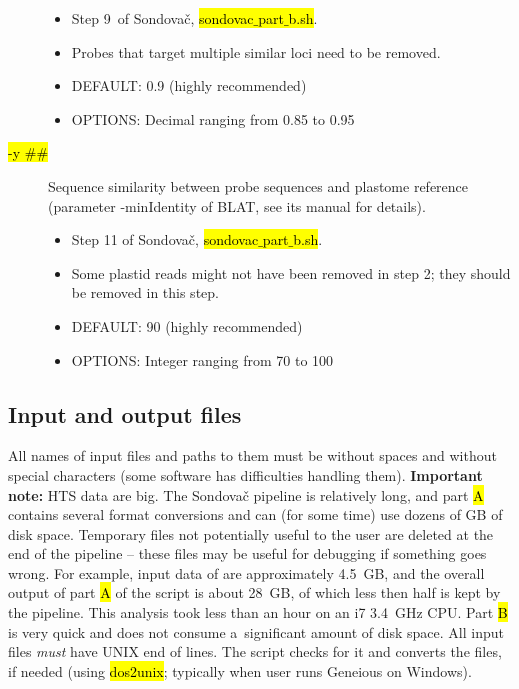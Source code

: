 \documentclass[a4paper, 11pt, twoside]{article}
\renewcommand{\texttt}[1]{\hl{\ttfamily #1}}
\begin{document}
\begin{description}
  \begin{itemize}
    \item Step 9~of Sondovač, \texttt{sondovac$\_$part$\_$b.sh}.
    \item Probes that target multiple similar loci need to be removed.
    \item DEFAULT: 0.9 (highly recommended)
    \item OPTIONS: Decimal ranging from 0.85 to 0.95
  \end{itemize}
\item[\texttt{-y \#\#}] Sequence similarity between probe sequences and plastome reference (parameter -minIde\-ntity of BLAT, see its manual for details).
  \begin{itemize}
    \item Step 11 of Sondovač, \texttt{sondovac$\_$part$\_$b.sh}.
    \item Some plastid reads might not have been removed in step 2; they should be removed in this step.
    \item DEFAULT: 90 (highly recommended)
    \item OPTIONS: Integer ranging from 70 to 100
  \end{itemize}
\end{description}

\subsection{Input and output files}

All names of input files and paths to them must be without spaces and without special characters (some software has difficulties handling them). \textbf{Important note:} HTS data are big. The Sondovač pipeline is relatively long, and part \texttt{A} contains several format conversions and can (for some time) use dozens of GB of disk space. Temporary files not potentially useful to the user are deleted at the end of the pipeline -- these files may be useful for debugging if something goes wrong. For example, input data of \citet{Schmickl2016} are approximately 4.5~GB, and the overall output of part \texttt{A} of the script is about 28~GB, of which less then half is kept by the pipeline. This analysis took less than an hour on an i7 3.4~GHz CPU. Part \texttt{B} is very quick and does not consume a~significant amount of disk space. All input files \textit{must} have UNIX end of lines. The script checks for it and converts the files, if needed (using \texttt{dos2unix}; typically when user runs Geneious on Windows).
\end{document}
